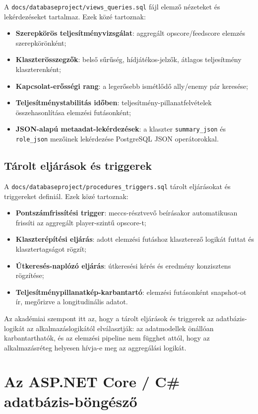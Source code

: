 ﻿\documentclass[a4paper,12pt]{report}
\begin{document}
A \texttt{docs/databaseproject/views\_queries.sql} fájl elemző nézeteket és lekérdezéseket tartalmaz. Ezek közé tartoznak:
\begin{itemize}
    \item \textbf{Szerepkörös teljesítményvizsgálat}: aggregált opscore/feedscore elemzés szerepkörönként;
    \item \textbf{Klaszterösszegzők}: belső sűrűség, hídjátékos-jelzők, átlagos teljesítmény klaszterenként;
    \item \textbf{Kapcsolat-erősségi rang}: a legerősebb ismétlődő ally/enemy pár keresése;
    \item \textbf{Teljesítménystabilitás időben}: teljesítmény-pillanatfelvételek összehasonlítása elemzési futásonként;
    \item \textbf{JSON-alapú metaadat-lekérdezések}: a klaszter \texttt{summary\_json} és \texttt{role\_json} mezőinek lekérdezése PostgreSQL JSON operátorokkal.
\end{itemize}

\subsection{Tárolt eljárások és triggerek}

A \texttt{docs/databaseproject/procedures\_triggers.sql} tárolt eljárásokat és triggereket definiál. Ezek közé tartoznak:
\begin{itemize}
    \item \textbf{Pontszámfrissítési trigger}: meccs-résztvevő beírásakor automatikusan frissíti az aggregált player-szintű opscore-t;
    \item \textbf{Klaszterépítési eljárás}: adott elemzési futáshoz klaszterező logikát futtat és klasztertagságot rögzít;
    \item \textbf{Útkeresés-naplózó eljárás}: útkeresési kérés és eredmény konzisztens rögzítése;
    \item \textbf{Teljesítménypillanatkép-karbantartó}: elemzési futásonként snapshot-ot ír, megőrizve a longitudinális adatot.
\end{itemize}

Az akadémiai szempont itt az, hogy a tárolt eljárások és triggerek az adatbázis-logikát az alkalmazáslogikától elválasztják: az adatmodellek önállóan karbantarthatók, és az elemzési pipeline nem függhet attól, hogy az alkalmazásréteg helyesen hívja-e meg az aggregálási logikát.

\section{Az ASP.NET Core / C\# adatbázis-böngésző}
\end{document}

